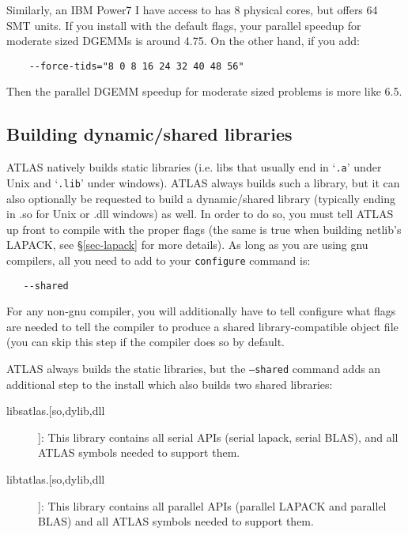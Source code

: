 \documentclass[11pt]{article}
\begin{document}
Similarly, an IBM Power7 I have access to has 8 physical cores, but offers
64 SMT units.  If you install with the default flags, your parallel speedup
for moderate sized DGEMMs is around 4.75.  On the other hand, if you add:
\begin{verbatim}
    --force-tids="8 0 8 16 24 32 40 48 56"
\end{verbatim}
Then the parallel DGEMM speedup for moderate sized problems is more like 6.5.

\clearpage
\subsection{Building dynamic/shared libraries}
\label{sec-shared}
ATLAS natively builds static libraries (i.e. libs that usually end in
`\texttt{.a}' under Unix and `\texttt{.lib}' under windows).  
ATLAS always builds such a library,
but it can also optionally be requested to build a dynamic/shared library
(typically ending in .so for Unix or .dll windows) as well.  In order to do so,
you must tell ATLAS up front to compile with the proper flags (the same is
true when building netlib's LAPACK, see \S\ref{sec-lapack} for more details).  
As long as you are using gnu compilers, all you need to add to your 
{\tt configure} command is:
\vspace*{-0.1in}
\begin{verbatim}
   --shared
\end{verbatim}

For any non-gnu compiler, you will additionally have to tell configure what
flags are
needed to tell the compiler to produce a shared library-compatible object
file (you can skip this step if the compiler does so by default.

ATLAS always builds the static libraries, but the {\tt --shared} command
adds an additional step to the install which also builds two shared libraries:
\begin{description}
\item [libsatlas.[so,dylib,dll]]: This library contains all serial APIs
      (serial lapack, serial BLAS), 
      and all ATLAS symbols needed to support them.
\item [libtatlas.[so,dylib,dll]]: This library contains all parallel
      APIs (parallel LAPACK and parallel BLAS) 
      and all ATLAS symbols needed to support them.
\end{description}
\end{document}
